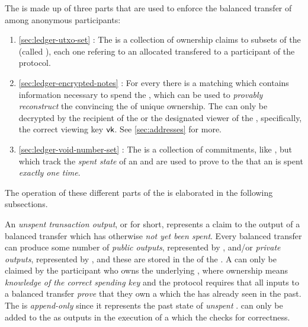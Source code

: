 The \ShieldedAssetPool{} is made up of three parts that are used to enforce the balanced transfer of  among anonymous participants:

\begin{enumerate}
    \item \autoref{sec:ledger-utxo-set} \UTXOSet{}: The \UTXOSet{} is a collection of ownership claims to subsets of the \ShieldedAssetPool{} (called ), each one refering to an allocated \Asset{} transfered to a participant of the protocol.
    \item \autoref{sec:ledger-encrypted-notes} : For every \UTXO{} there is a matching \EncryptedNote{} which contains information necessary to spend the \Asset{}, which can be used to \emph{provably reconstruct} the \UTXO{} convincing the \Ledger{} of unique ownership. The \EncryptedNote{} can only be decrypted by the recipient of the \Asset{} or the designated viewer of the \UTXO{}, specifically, the correct viewing key ${\textsf{vk}}$. See \autoref{sec:addresses} for more.
    \item \autoref{sec:ledger-void-number-set} \VoidNumberSet{}: The \VoidNumberSet{} is a collection of commitments, like , but which track the \emph{spent state} of an \Asset{} and are used to prove to the \Ledger{} that an \Asset{} is spent \emph{exactly one time}. 
\end{enumerate}

The operation of these different parts of the \ShieldedAssetPool{} is elaborated in the following subsections.


An \emph{unspent transaction output}, or \UTXO{} for short, represents a claim to the output of a balanced transfer which has otherwise \emph{not yet been spent}. Every balanced transfer can produce some number of \emph{public outputs}, represented by , and/or \emph{private outputs}, represented by , and these  are stored in the \UTXOSet{} of the \ShieldedAssetPool{}. A \UTXO{} can only be claimed by the participant who owns the underlying \Asset{}, where ownership means \emph{knowledge of the correct spending key} and the \Transfer{} protocol requires that all inputs to a balanced transfer \emph{prove} that they own a \UTXO{} which the \ShieldedAssetPool{} has already seen in the past. The \UTXOSet{} is \emph{append-only} since it represents the past state of \emph{unspent} .  can only be added to the \UTXOSet{} as outputs in the execution of a \Transfer{} which the \Ledger{} checks for correctness.

